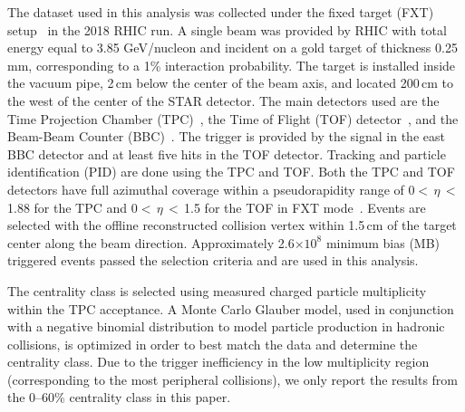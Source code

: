 \documentclass[%
 reprint,	
showpacs,
 amsmath,amssymb,
 aps,
 superscriptaddress,
]{revtex4-1}
\begin{document}
The dataset used in this analysis
was collected under the fixed target (FXT) setup~\cite{Meehan_2016} in the 2018 RHIC run. 
A single beam was provided by RHIC with total energy equal to 3.85 GeV/nucleon and incident on a gold target of thickness 0.25 mm, corresponding to a 1\% interaction probability.
The target is installed inside the vacuum pipe, 2\,cm below the center of the beam axis, and located 200\,cm to the west of the center of the STAR detector. The main detectors used are the Time Projection Chamber (TPC)~\cite{TPC}, the Time of Flight (TOF) detector~\cite{TOF}, and the Beam-Beam Counter (BBC)~\cite{BBC_Whitten}. The trigger is provided by the signal in the east BBC detector and at least five hits in the TOF detector. Tracking and particle identification (PID) are done using the TPC and TOF. Both the TPC and TOF detectors have full azimuthal coverage within a pseudorapidity range of 0$<$\,$\eta$\,$<$\,1.88 for the TPC and 0$<$\,$\eta$\,$<$\,1.5 for the TOF in FXT mode~\cite{TPC,TOF}. Events are selected with the offline reconstructed collision vertex within 1.5\,cm of the target center along the beam direction. Approximately 2.6$\times 10^{8}$ minimum bias (MB) triggered events passed the selection criteria and are used in this analysis. 

The centrality class is selected using measured charged particle multiplicity within the TPC acceptance. 
A Monte Carlo Glauber model, used in conjunction with a negative binomial distribution to model particle production in hadronic collisions, is optimized in order to best match the data and determine the centrality class. Due to the trigger inefficiency in the low multiplicity region (corresponding to the most peripheral collisions), we only report the results from the 0--60\% %
centrality class in this paper.
\end{document}

